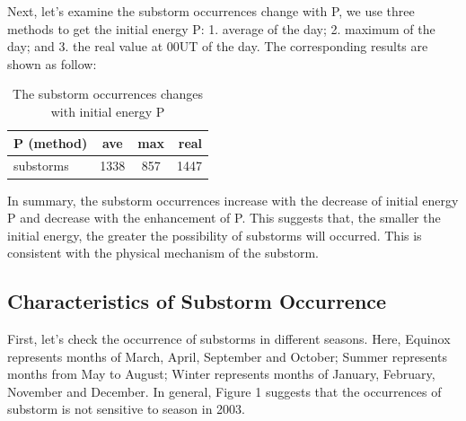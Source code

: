 \documentclass[12pt, letterpaper]{article} %
\begin{document}
Next, let's examine the substorm occurrences change with P, we use three methods to get the initial energy P: 1. average of the day; 2. maximum of the day; and 3. the real value at 00UT of the day. The corresponding results are shown as follow:


\begin{table}[!h] %
  \begin{center} %
  \begin{tabular}{|l|c|c|r|} %
    \hline %
    P (method) & ave & max &  real\\ %
    \hline %
    \hline %
    substorms & 1338 & 857 & 1447\\ %
    \hline %
  \end{tabular} %
  \caption{The substorm occurrences changes with initial energy P} %
  \label{tab:tab2} %
  \end{center} %
\end{table} %

In summary, the substorm occurrences increase with the decrease of initial energy P and decrease with the enhancement of P. This suggests that, the smaller the initial energy, the greater the possibility of substorms will occurred. This is consistent with the physical mechanism of the substorm. 

\subsection{Characteristics of Substorm Occurrence} %
First, let's check the occurrence of substorms in different seasons. Here, Equinox represents months of March, April, September and October; Summer represents months from May to August; Winter represents months of January, February, November and December. In general, Figure 1 suggests that the occurrences of substorm is not sensitive to season in 2003.
\end{document}
